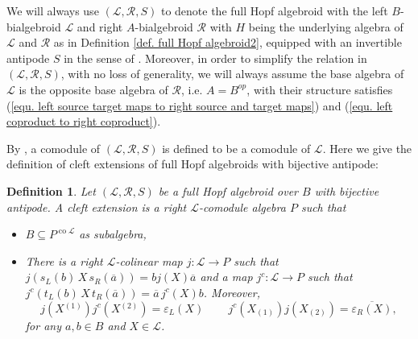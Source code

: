 \documentclass[a4paper,reqno]{amsart}
\numberwithin{equation}{section}
\theoremstyle{plain}
\newtheorem{defi}[thm]{Definition}
\theoremstyle{remark}
\numberwithin{equation}{section}
\newcommand\ol{\overline}
\newcommand{\cL}{\mathcal{L}}
\newcommand{\cR}{\mathcal{R}}
\newcommand{\teins}[1]{{#1}{}{}^{\scriptscriptstyle{(1)}}}
\newcommand{\tzwei}[1]{{#1}{}{}^{\scriptscriptstyle{(2)}}}
\renewcommand{\o}{{}_{\scriptscriptstyle{(1)}}}
\renewcommand{\t}{{}_{\scriptscriptstyle{(2)}}}
\newcommand{\CR}{\mathcal{R}}
\newcommand{\CL}{\mathcal{L}}
\newcommand\co{{\operatorname{co}}}
\begin{document}
 We will always use $(\cL, \cR, S)$ to denote the full Hopf algebroid with the left $B$-bialgebroid $\cL$ and right $A$-bialgebroid $\cR$ with $H$ being the underlying algebra of $\cL$ and $\cR$ as in Definition \ref{def. full Hopf algebroid2}, equipped with an invertible antipode $S$ in the sense of . Moreover, in order to simplify the relation in $(\cL, \cR, S)$, with no loss of generality, we will always assume the base algebra of $\cL$ is the opposite base algebra of $\cR$, i.e. $A=B^{op}$, with their structure satisfies (\ref{equ. left source target maps to right source and target maps}) and (\ref{equ. left coproduct to right coproduct}).

 
 By \cite{BB}, a comodule of $(\CL,\CR, S)$ is defined to be a comodule of $\CL$. Here we give the definition of cleft extensions of full Hopf algebroids with bijective antipode:
 \begin{defi}\cite{BB}\label{def. cleft extension by BB}
     Let $(\CL,\CR, S)$ be a full Hopf algebroid over $B$ with bijective antipode. A cleft extension is a right $\CL$-comodule algebra $P$ such that 
      \begin{itemize}
        \item [(i)] $B\subseteq P^{\co\CL}$ as subalgebra,
 \item[(ii)]  There is a right $\cL$-colinear map $j:\CL\to P$  such that $j(s_{L}(b)\,X\,s_{R}(\ol a))=bj(X)\ol a$ and a map  $j^{c}:\CL\to P$ such that $j^{c}(t_{L}(b)\,X\,t_{R}(\ol a))=\ol a \,j^{c}(X)b$. Moreover, 
 \[j(X\teins{})j^{c}(X\tzwei{})=\varepsilon_{L}(X)\,\qquad j^{c}(X\o)j(X\t)=\overline{\varepsilon_{R}(X)}, \]
 for any $a,b\in B$ and $X\in \CL$.
 \end{itemize}
 \end{defi}
 
\end{document}
